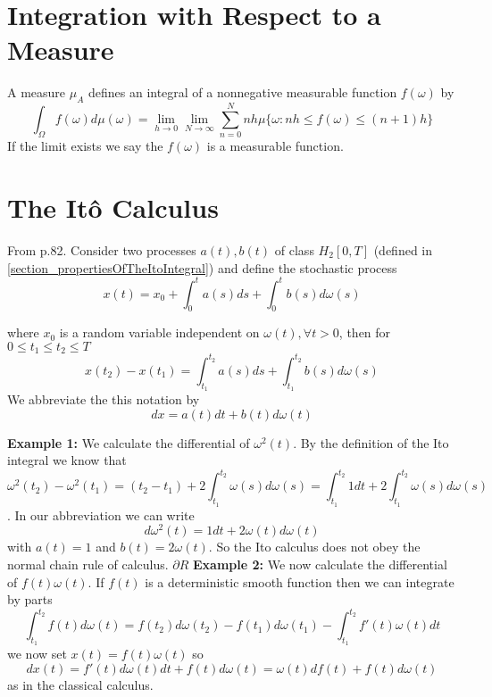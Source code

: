 \documentclass[12pt]{book}
\begin{document}
\section{Integration with Respect to a Measure}
A measure $\mu_A$ defines an integral of a nonnegative measurable function $f(\omega)$ by 
\begin{equation*}
\int_{\Omega}f(\omega)d\mu(\omega)=\lim_{h\rightarrow 0}\lim_{N\rightarrow \infty}\sum_{n=0}^{N}nh\mu\{\omega: nh\leq f(\omega)\leq(n+1)h\}
\end{equation*}
If the limit exists we say the $f(\omega)$ is a measurable function. 


\section{The It\^{o} Calculus}\label{section_theItoCalculus}
From \cite{schuss2009theory} p.82. Consider two processes $a(t),b(t)$ of class $H_2[0,T]$ (defined in \ref{section_propertiesOfTheItoIntegral}) and define the stochastic process
\begin{equation*}
x(t) = x_0 + \int_0^t a(s)ds + \int_0^t b(s)d\omega(s)
\end{equation*}

where $x_0$ is a random variable independent on $\omega(t),\forall t>0$, then for $0\leq t_1\leq t_2 \leq T$
\begin{equation*}
x(t_2)-x(t_1)=\int_{t_1}^{t_2}a(s)ds +\int_{t_1}^{t_2}b(s)d\omega(s)
\end{equation*}
We abbreviate the this notation by 
\begin{equation*}
dx=a(t)dt+b(t)d\omega(t)
\end{equation*}

\textbf{Example 1:} We calculate the differential of $\omega^2(t)$. By the definition of the Ito integral we know that 
\begin{equation*}
\omega^2(t_2)-\omega^2(t_1)=(t_2-t_1)+2\int_{t_1}^{t_2}\omega(s)d\omega(s)=\int_{t_1}^{t_2}1dt+2\int_{t_1}^{t_2}\omega(s)d\omega(s)
\end{equation*}. 
In our abbreviation we can write 
\begin{equation*}
d\omega^2(t) = 1dt+2\omega(t)d\omega(t)
\end{equation*}
with $a(t)=1$ and $b(t)=2\omega(t)$. So the Ito calculus does not obey the normal chain rule of calculus.
$\partial R$
\textbf{Example 2:} We now calculate the differential of $f(t)\omega(t)$. If $f(t)$ is a deterministic smooth function then we can integrate by parts
\begin{equation*}
\int_{t_1}^{t_2}f(t)d\omega(t)= f(t_2)d\omega(t_2)-f(t_1)d\omega(t_1)-\int_{t_1}^{t_2}f'(t)\omega(t)dt
\end{equation*}
we now set $x(t)= f(t)\omega(t)$ so 
\begin{equation*}
dx(t) = f'(t)d\omega(t)dt+f(t)d\omega(t)=\omega(t)df(t)+f(t)d\omega(t)
\end{equation*}
as in the classical calculus. 
\end{document}
